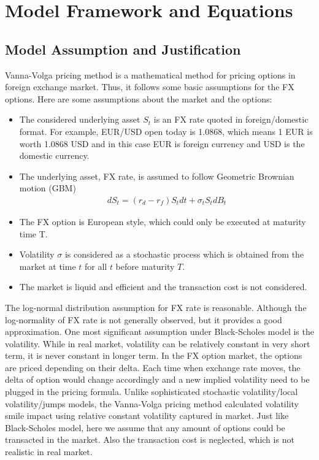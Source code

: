 \section{Model Framework and Equations}
\subsection{Model Assumption and Justification} 
Vanna-Volga pricing method is a mathematical method for pricing options in foreign exchange market. Thus, it follows some basic assumptions for the FX options. Here are some assumptions about the market and the options:
\begin{itemize}
	\item The considered underlying asset $S_t$ is an FX rate quoted in foreign/domestic format. For example, EUR/USD open today is 1.0868, which means 1 EUR is worth 1.0868 USD and in this case EUR is foreign currency and USD is the domestic currency.
	\item The underlying asset, FX rate, is assumed to follow Geometric Brownian motion (GBM)
	\begin{align}
	dS_t = \left( r_d - r_f\right) S_tdt + \sigma_t S_t dB_t
	\end{align}  
	\item The FX option is European style, which could only be executed at maturity time T.
	\item Volatility $\sigma$ is considered as a stochastic process which is obtained from the market at time $t$ for all $t$ before maturity $T$. 
	\item The market is liquid and efficient and the transaction cost is not considered.
\end{itemize}
The log-normal distribution assumption for FX rate is reasonable. Although the log-normality of FX rate is not generally observed, but it provides a good approximation. \newline
One most significant assumption under Black-Scholes model is the volatility. While in real market, volatility can be relatively constant in very short term, it is never constant in longer term. In the FX option market, the options are priced depending on their delta. Each time when exchange rate moves, the delta of option would change accordingly and a new implied volatility need to be plugged in the pricing formula. Unlike sophisticated stochastic volatility/local volatility/jumps models, the Vanna-Volga pricing method calculated volatility smile impact using relative constant volatility captured in market. \newline
Just like Black-Scholes model, here we assume that any amount of options could be transacted in the market. Also the transaction cost is neglected, which is not realistic in real market.

